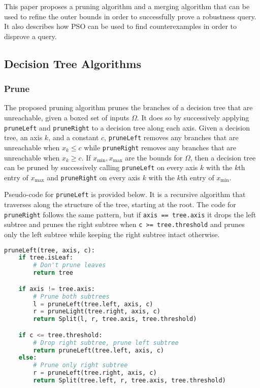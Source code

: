 \documentclass[pageno]{jpaper}
\newcommand{\xmin}{x_{\textrm{min}}}
\newcommand{\xmax}{x_{\textrm{max}}}
\begin{document}
\begin{doublespacing}
This paper proposes a pruning algorithm and a merging algorithm that can be used to refine the outer bounds in order to successfully prove a robustness query. It also describes how PSO can be used to find counterexamples in order to disprove a query.

\subsection{Decision Tree Algorithms}
\label{sec:algorithms}
\subsubsection{Prune}
The proposed pruning algorithm prunes the branches of a decision tree that are unreachable, given a boxed set of inputs $\Omega$. It does so by successively applying \verb|pruneLeft| and \verb|pruneRight| to a decision tree along each axis. Given a decision tree, an axis $k$, and a constant $c$, \verb|pruneLeft| removes any branches that are unreachable when $x_k \le c$ while \verb|pruneRight| removes any branches that are unreachable when $x_k \ge c$. If $\xmin, \xmax$ are the bounds for $\Omega$, then a decision tree can be pruned by successively calling \verb|pruneLeft| on every axis $k$ with the $k$th entry of $\xmax$ and \verb|pruneRight| on every axis $k$ with the $k$th entry of $\xmin$. 

Pseudo-code for \verb|pruneLeft| is provided below. It is a recursive algorithm that traverses along the structure of the tree, starting at the root. The code for \verb|pruneRight| follows the same pattern, but if \verb|axis == tree.axis| it drops the left subtree and prunes the right subtree when \verb|c >= tree.threshold| and prunes only the left subtree while keeping the right subtree intact otherwise.

{\singlespacing
\begin{lstlisting}[language=Python, caption=pruneLeft algorithm]
pruneLeft(tree, axis, c):
	if tree.isLeaf:
		# Don't prune leaves
		return tree

	if axis != tree.axis:
		# Prune both subtrees
		l = pruneLeft(tree.left, axis, c)
		r = pruneLight(tree.right, axis, c)
		return Split(l, r, tree.axis, tree.threshold)

	if c <= tree.threshold:
		# Drop right subtree, prune left subtree
		return pruneLeft(tree.left, axis, c)
	else:
		# Prune only right subtree
		r = pruneLeft(tree.right, axis, c)
		return Split(tree.left, r, tree.axis, tree.threshold)		
\end{lstlisting}
}


\end{doublespacing}
\end{document}
